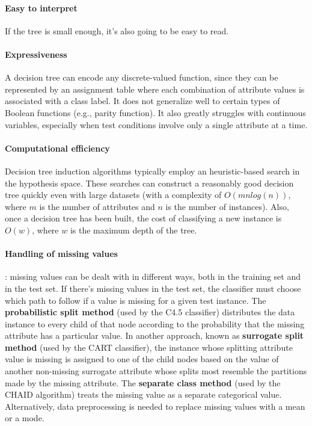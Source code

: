 \paragraph{Easy to interpret}
If the tree is small enough, it's also going to be easy to read.

\paragraph{Expressiveness}
A decision tree can encode any discrete-valued function, since they can be represented by an assignment table where each combination of attribute values is associated with a class label. It does not generalize well to certain types of Boolean functions (e.g., parity function). It also greatly struggles with continuous variables, especially when test conditions involve only a single attribute at a time.

\paragraph{Computational efficiency}
Decision tree induction algorithms typically employ an heuristic-based search in the hypothesis space. These searches can construct a reasonably good decision tree quickly even with large datasets (with a complexity of $O(m nlog(n))$, where $m$ is the number of attributes and $n$ is the number of instances). Also, once a decision tree has been built, the cost of classifying a new instance is $O(w)$, where $w$ is the maximum depth of the tree.

\paragraph{Handling of missing values}: missing values can be dealt with in different ways, both in the training set and in the test set. If there's missing values in the test set, the classifier must choose which path to follow if a value is missing for a given test instance. The \textbf{probabilistic split method} (used by the C4.5 classifier) distributes the data instance to every child of that node according to the probability that the missing attribute has a particular value. In another approach, known as \textbf{surrogate split method} (used by the CART classifier), the instance whose splitting attribute value is missing is assigned to one of the child nodes based on the value of another non-missing surrogate attribute whose splits most resemble the partitions made by the missing attribute. The \textbf{separate class method} (used by the CHAID algorithm) treats the missing value as a separate categorical value. Alternatively, data preprocessing is needed to replace missing values with a mean or a mode.

